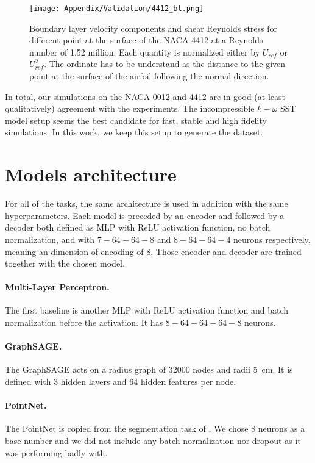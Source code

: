 \begin{subappendices}
	\begin{figure}
		\centering
		\texttt{[image: Appendix/Validation/4412\_bl.png]}
		\caption[Boundary layer profiles for a \acrshort{NACA} 4412 at \SI{13.87}{\degree}.]{Boundary layer velocity components and shear Reynolds stress for different point at the surface of the \acrshort{NACA} 4412 at a Reynolds number of 1.52 million. Each quantity is normalized either by $U_{ref}$ or $U_{ref}^2$. The ordinate has to be understand as the distance to the given point at the surface of the airfoil following the normal direction.}
		\label{fig:bl_4412}
	\end{figure}
	
	In total, our simulations on the \acrshort{NACA} 0012 and 4412 are in good (at least qualitatively) agreement with the experiments. The incompressible $k-\omega$ SST model setup seems the best candidate for fast, stable and high fidelity simulations. In this work, we keep this setup to generate the dataset.
	
	\section{Models architecture}\label{ap:models}
	For all of the tasks, the same architecture is used in addition with the same hyperparameters. Each model is preceded by an encoder and followed by a decoder both defined as \acrshort{MLP} with ReLU activation function, no batch normalization, and with $7-64-64-8$ and $8-64-64-4$ neurons respectively, meaning an dimension of encoding of 8. Those encoder and decoder are trained together with the chosen model.
	
	\paragraph{Multi-Layer Perceptron.} The first baseline is another \acrshort{MLP} with ReLU activation function and batch normalization before the activation. It has $8-64-64-64-8$ neurons.
	
	\paragraph{GraphSAGE.} The GraphSAGE acts on a radius graph of 32000 nodes and radii \SI{5}{\centi\meter}. It is defined with 3 hidden layers and 64 hidden features per node.
	
	\paragraph{PointNet.} The PointNet is copied from the segmentation task of \cite{qi2016pointnet}. We chose 8 neurons as a base number and we did not include any batch normalization nor dropout as it was performing badly with.
	

\end{subappendices}
